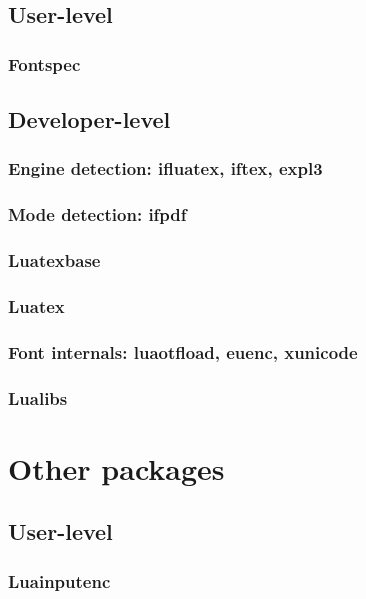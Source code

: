 \documentclass{lltxdoc}
\begin{document}
\subsection{User-level}

\subsubsection{Fontspec}

\subsection{Developer-level}

\subsubsection{Engine detection: ifluatex, iftex, expl3}

\subsubsection{Mode detection: ifpdf}

\subsubsection{Luatexbase}

\subsubsection{Luatex}

\subsubsection{Font internals: luaotfload, euenc, xunicode}

\subsubsection{Lualibs}

\section{Other packages}

\subsection{User-level}

\subsubsection{Luainputenc}
\end{document}
